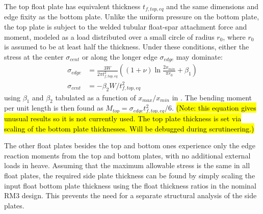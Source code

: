 The top float plate has equivalent thickness $t_{f,top,eq}$ and the same dimensions and edge fixity as the bottom plate.
Unlike the uniform pressure on the bottom plate, the top plate is subject to the welded tubular float-spar attachment force and moment, modeled as a load distributed over a small circle of radius $r_0$, where $r_0$ is assumed to be at least half the thickness.
Under these conditions, either the stress at the center $\sigma_{cent}$ or along the longer edge $\sigma_{edge}$ may dominate:
\begin{equation}
    \begin{aligned}
    \sigma_{edge}&= \frac{3W}{2\pi t_{f,top,eq}^2}\left( (1+\nu)\ln\frac{2x_{min}}{\pi r_0}+\beta_1\right)\\
        \sigma_{cent}&=-\beta_2 W/t_{f,top,eq}^2
    \end{aligned}
\end{equation}
using $\beta_1$ and $\beta_2$ tabulated as a function of $x_{max}/x_{min}$ in \cite{young_roarks_2001}.
The bending moment per unit length is then found as $M_{top}=\sigma_{edge}t_{f,top,eq}^2/6$. \hl{(Note: this equation gives unusual results so it is not currently used. The top plate thickness is set via scaling of the bottom plate thicknesses. Will be debugged during scrutineering.)}

The other float plates besides the top and bottom ones experience only the edge reaction moments from the top and bottom plates, with no additional external loads in heave. 
Assuming that the maximum allowable stress is the same in all float plates, the required side plate thickness can be found by simply scaling the input float bottom plate thickness using the float thickness ratios in the nominal RM3 design. This prevents the need for a separate structural analysis of the side plates.

